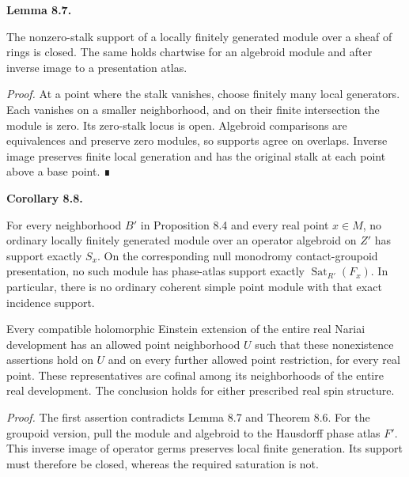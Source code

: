 \documentclass[
  english,
  11pt,
  reqno]{amsart}
\makeatletter
\newcounter{none} %
\newcommand{\pandocstatementheading}[1]{%
  \par\addpenalty{\@beginparpenalty}%
  \addvspace{.5\baselineskip plus .2\baselineskip minus .2\baselineskip}%
  {\normalfont\bfseries #1\par}%
  \nobreak\@afterindenttrue\@afterheading
}
\makeatother
\begin{document}
\pandocstatementheading{\protect{}\label{lem:finite-module-closed-support}Lemma 8.7.}

The nonzero-stalk support of a locally finitely generated module over a
sheaf of rings is closed. The same holds chartwise for an algebroid
module and after inverse image to a presentation atlas.

\emph{Proof.} At a point where the stalk vanishes, choose finitely many
local generators. Each vanishes on a smaller neighborhood, and on their
finite intersection the module is zero. Its zero-stalk locus is open.
Algebroid comparisons are equivalences and preserve zero modules, so
supports agree on overlaps. Inverse image preserves finite local
generation and has the original stalk at each point above a base point.
∎

\pandocstatementheading{\protect{}\label{cor:nariai-cofinal-point-module-obstruction-v09}Corollary 8.8.}

For every neighborhood \(B'\) in Proposition 8.4 and every real point
\(x\in M\), no ordinary locally finitely generated module over an
operator algebroid on \(Z'\) has support exactly \(S_x\). On the
corresponding null monodromy contact-groupoid presentation, no such
module has phase-atlas support exactly \(\operatorname{Sat}_{R'}(F_x)\).
In particular, there is no ordinary coherent simple point module with
that exact incidence support.

Every compatible holomorphic Einstein extension of the entire real
Nariai development has an allowed point neighborhood \(U\) such that
these nonexistence assertions hold on \(U\) and on every further allowed
point restriction, for every real point. These representatives are
cofinal among its neighborhoods of the entire real development. The
conclusion holds for either prescribed real spin structure.

\emph{Proof.} The first assertion contradicts Lemma 8.7 and Theorem 8.6.
For the groupoid version, pull the module and algebroid to the Hausdorff
phase atlas \(F'\). This inverse image of operator germs preserves local
finite generation. Its support must therefore be closed, whereas the
required saturation is not.
\end{document}
